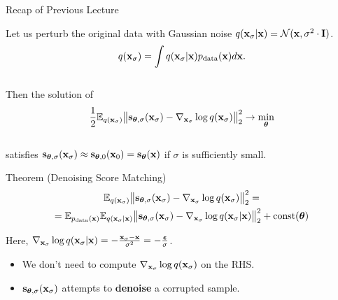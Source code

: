 \documentclass{beamer}
\begin{document}
\begin{frame}
\titlepage
    \resetonslide
\end{frame}
\begin{frame}{Recap of Previous Lecture}

    Let us perturb the original data with Gaussian noise $q(\mathbf{x}_{\sigma} | \mathbf{x}) = \mathcal{N}(\mathbf{x}, \sigma^2 \cdot \mathbf{I})$.
    \vspace{-0.3cm}
    \[
        q(\mathbf{x}_{\sigma}) = \int q(\mathbf{x}_{\sigma} | \mathbf{x}) p_{\text{data}}(\mathbf{x}) d\mathbf{x}.
    \]
    \vspace{-0.6cm} \\
    Then the solution of 
    \vspace{-0.2cm}
    \[
        \frac{1}{2} \mathbb{E}_{q(\mathbf{x}_{\sigma})}\bigl\| \mathbf{s}_{\boldsymbol{\theta}, \sigma}(\mathbf{x}_{\sigma}) - \nabla_{\mathbf{x}_{\sigma}} \log q(\mathbf{x}_{\sigma}) \bigr\|^2_2 \rightarrow \min_{\boldsymbol{\theta}}
    \]
    \vspace{-0.5cm} \\
    satisfies $\mathbf{s}_{\boldsymbol{\theta}, \sigma}(\mathbf{x}_{\sigma}) \approx \mathbf{s}_{\boldsymbol{\theta}, 0}(\mathbf{x}_0) = \mathbf{s}_{\boldsymbol{\theta}}(\mathbf{x})$ if $\sigma$ is sufficiently small.
    \begin{block}{Theorem (Denoising Score Matching)}
        \vspace{-0.8cm}
        \begin{multline*}
            \mathbb{E}_{q(\mathbf{x}_{\sigma})}\bigl\| \mathbf{s}_{\boldsymbol{\theta}, \sigma}(\mathbf{x}_{\sigma}) - \nabla_{\mathbf{x}_{\sigma}} \log q(\mathbf{x}_{\sigma}) \bigr\|^2_2 = \\ = \mathbb{E}_{p_{\text{data}}(\mathbf{x})} \mathbb{E}_{q(\mathbf{x}_{\sigma} | \mathbf{x})}\bigl\| \mathbf{s}_{\boldsymbol{\theta}, \sigma}(\mathbf{x}_{\sigma}) - \nabla_{\mathbf{x}_{\sigma}} \log q(\mathbf{x}_{\sigma} | \mathbf{x}) \bigr\|^2_2 + \text{const}(\boldsymbol{\theta})
        \end{multline*}
        \vspace{-0.7cm}
    \end{block}
    Here, $\nabla_{\mathbf{x}_{\sigma}} \log q(\mathbf{x}_{\sigma} | \mathbf{x}) = - \frac{\mathbf{x}_{\sigma} - \mathbf{x}}{\sigma^2} = - \frac{\boldsymbol{\epsilon}}{\sigma}$.
    \begin{itemize}
        \item We don't need to compute $\nabla_{\mathbf{x}_{\sigma}} \log q(\mathbf{x}_{\sigma})$ on the RHS.
        \item $\mathbf{s}_{\boldsymbol{\theta}, \sigma}(\mathbf{x}_{\sigma})$ attempts to \textbf{denoise} a corrupted sample.
    \end{itemize}
\end{frame}
\end{document}
